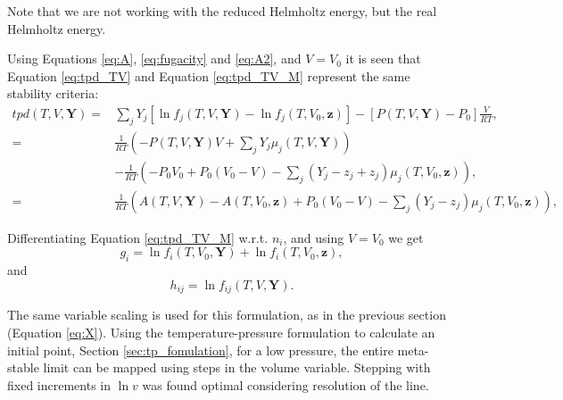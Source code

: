 \documentclass[internal,english]{sintefmemo2012}
\begin{document}
Note that we are not working with the reduced Helmholtz energy, but
the real Helmholtz energy.

Using Equations \ref{eq:A}, \ref{eq:fugacity} and \ref{eq:A2}, and
$V=V_0$ it is seen that Equation \ref{eq:tpd_TV} and Equation
\ref{eq:tpd_TV_M} represent the same stability criteria:
\begin{align}
  \label{eq:tpd_TV_M2}
  tpd(T,V,\mathbf{Y}) =&
  \underset{j}{\sum}Y_j\left[\ln f_j \left(T,V,\mathbf{Y}\right) -
    \ln f_j\left(T,V_0,\mathbf{z}\right)\right] -
  \left[P\left(T,V,\mathbf{Y}\right) - P_0\right]\frac{V}{RT},\\
  =& \frac{1}{RT}\left(-P\left(T,V,\mathbf{Y}\right) V +
     \underset{j}{\sum}Y_j\mu_j \left(T,V,\mathbf{Y}\right) \right)\\
  & - \frac{1}{RT}\left( - P_0V_0 + P_0\left(V_0-V\right)
    -\underset{j}{\sum}\left(Y_j - z_j + z_j\right)\mu_j\left(T,V_0,\mathbf{z}\right)
  \right)
  ,\\
  =& \frac{1}{RT}\left( A\left(T,V,\mathbf{Y}\right) -
     A\left(T,V_0,\mathbf{z}\right) + P_0\left(V_0-V\right) - \underset{j}{\sum}\left(Y_j - z_j\right)\mu_j\left(T,V_0,\mathbf{z}\right)\right),
\end{align}

Differentiating Equation \ref{eq:tpd_TV_M} w.r.t. $n_i$, and using $V=V_0$ we
get
\begin{equation}
  \label{eq:tpd_TV_n}
  g_i =
 \ln f_i\left(T,V_0,\mathbf{Y}\right) +
 \ln f_i\left(T,V_0,\mathbf{z}\right),
\end{equation}
and
\begin{equation}
  \label{eq:tpd_TV_h}
  h_{ij} =
 \ln f_{ij}\left(T,V,\mathbf{Y}\right) .
\end{equation}

The same variable scaling is used for this formulation, as in the
previous section (Equation \ref{eq:X}). Using the temperature-pressure
formulation to calculate an initial point, Section
\ref{sec:tp_fomulation}, for a low pressure, the entire meta-stable
limit can be mapped using steps in the volume variable. Stepping with
fixed increments in $\ln v$ was found optimal considering resolution of
the line.
\end{document}
